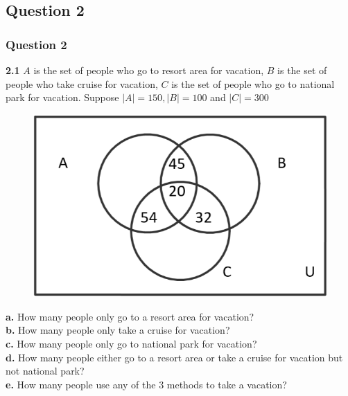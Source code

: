 \documentclass[xcolor=svgnames]{beamer}
\begin{document}
\subsection{Question 2}
\begin{frame}
\frametitle{Question 2}
\begin{multicols}{2}
\footnotesize{ 
\textbf{2.1} $A$ is the set of people who go to resort area for vacation, $B$ is the set of people who take cruise for vacation, $C$ is the set of people who go to national park for vacation. Suppose $|A| = 150, |B| = 100$ and $|C|=300$
}
\begin{figure}
\includegraphics[width=0.8\linewidth]{dstut3q2.png}
\end{figure}
\footnotesize{
\textbf{a.} How many people only go to a resort area for vacation? \\
\textbf{b.} How many people only take a cruise for vacation? \\
\textbf{c.} How many people only go to national park for vacation? \\
\textbf{d.} How many people either go to a resort area or take a cruise for vacation but not national park? \\
\textbf{e.} How many people use any of the 3 methods to take a vacation? \\
}
\end{multicols} 
\end{frame}
\end{document}
